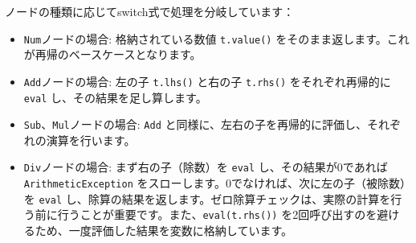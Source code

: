 \begin{Shaded}
\begin{Highlighting}[]
 
   
    \NormalTok{();}
    \NormalTok{()) + }\NormalTok{());}
    \NormalTok{()) {-} }\NormalTok{());}
    \NormalTok{()) * }\NormalTok{());}
      \NormalTok{()); }
      \NormalTok{) \{ }
          \NormalTok{(}\NormalTok{);}
\NormalTok{      \}}
\NormalTok{    \}}
\NormalTok{  \};}
\NormalTok{\}}
\end{Highlighting}
\end{Shaded}

ノードの種類に応じてswitch式で処理を分岐しています：

\begin{itemize}
\tightlist
\item
  \texttt{Num}ノードの場合: 格納されている数値 \texttt{t.value()}
  をそのまま返します。これが再帰のベースケースとなります。
\item
  \texttt{Add}ノードの場合: 左の子 \texttt{t.lhs()} と右の子
  \texttt{t.rhs()} をそれぞれ再帰的に \texttt{eval}
  し、その結果を足し算します。
\item
  \texttt{Sub}、\texttt{Mul}ノードの場合: \texttt{Add}
  と同様に、左右の子を再帰的に評価し、それぞれの演算を行います。
\item
  \texttt{Div}ノードの場合: まず右の子（除数）を \texttt{eval}
  し、その結果が0であれば \texttt{ArithmeticException}
  をスローします。0でなければ、次に左の子（被除数）を \texttt{eval}
  し、除算の結果を返します。ゼロ除算チェックは、実際の計算を行う前に行うことが重要です。また、\texttt{eval(t.rhs())}
  を2回呼び出すのを避けるため、一度評価した結果を変数に格納しています。
\end{itemize}

